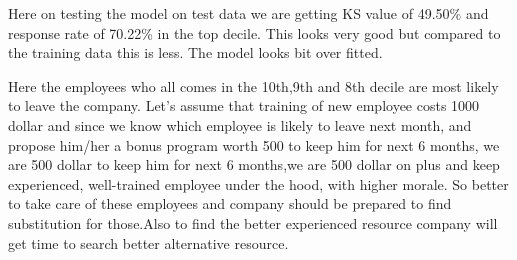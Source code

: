 \documentclass[11pt]{article}
\begin{document}
    Here on testing the model on test data we are getting KS value of
49.50\% and response rate of 70.22\% in the top decile. This looks very
good but compared to the training data this is less. The model looks bit
over fitted.

    Here the employees who all comes in the 10th,9th and 8th decile are most
likely to leave the company. Let's assume that training of new employee
costs 1000 dollar and since we know which employee is likely to leave
next month, and propose him/her a bonus program worth 500 to keep him
for next 6 months, we are 500 dollar to keep him for next 6 months,we
are 500 dollar on plus and keep experienced, well-trained employee under
the hood, with higher morale. So better to take care of these employees
and company should be prepared to find substitution for those.Also to
find the better experienced resource company will get time to search
better alternative resource.


    
    
    
    
\end{document}

